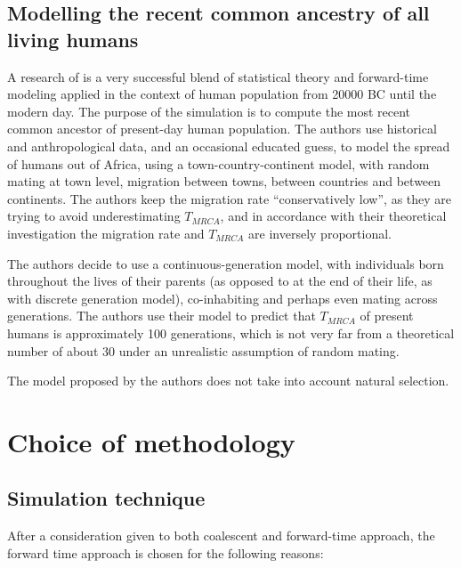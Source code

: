 \documentclass{l4proj}
\begin{document}
\section{Modelling the recent common ancestry of all living humans}

A research of \cite{rohde04} is a very successful blend of statistical theory and forward-time modeling applied in the context of human population from 20000 BC until the modern day. The purpose of the simulation is to compute the most recent common ancestor of present-day human population. The authors use historical and anthropological data, and an occasional educated guess, to model the spread of humans out of Africa, using a town-country-continent model, with random mating at town level, migration between towns, between countries and between continents. The authors keep the migration rate ``conservatively low'', as they are trying to avoid underestimating $T_{MRCA}$, and in accordance with their theoretical investigation the migration rate and $T_{MRCA}$ are inversely proportional.

The authors decide to use a continuous-generation model, with individuals born throughout the lives of their parents (as opposed to at the end of their life, as with discrete generation model), co-inhabiting and perhaps even mating across generations. The authors use their model to predict that $T_{MRCA}$ of present humans is approximately 100 generations, which is not very far from a theoretical number of about 30 under an unrealistic assumption of random mating.

The model proposed by the authors does not take into account natural selection.


\chapter{Choice of methodology}\label{methodology}

\section{Simulation technique}

After a consideration given to both coalescent and forward-time approach, the forward time approach is chosen for the following reasons:
\end{document}
